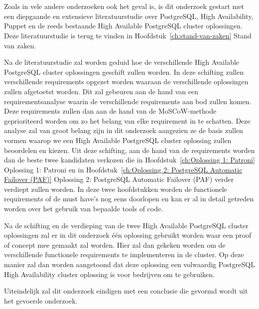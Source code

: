 
\chapter{}
\label{ch:methodologie}


Zoals in vele andere onderzoeken ook het geval is, is dit onderzoek gestart met een diepgaande en extensieve literatuurstudie over PostgreSQL, High Availability, Puppet en de reeds bestaande High Available PostgreSQL cluster oplossingen. Deze literatuurstudie is terug te vinden in Hoofdstuk~\ref{ch:stand-van-zaken} Stand van zaken.

Na de literatuurstudie zal worden geduid hoe de verschillende High Available PostgreSQL cluster oplossingen geschift zullen worden. In deze schifting zullen verschillende requirements opgezet worden waaraan de verschillende oplossingen zullen afgetoetst worden. Dit zal gebeuren aan de hand van een requirementsanalyse waarin de verschillende requirements aan bod zullen komen. Deze requirements zullen dan aan de hand van de MoSCoW-methode geprioriteerd worden om zo het belang van elke requirement in te schatten. Deze analyse zal van groot belang zijn in dit onderzoek aangezien ze de basis zullen vormen waarop we een High Available PostgreSQL cluster oplossing zullen beoordelen en kiezen.
Uit deze schifting, aan de hand van de requirements worden dan de beste twee kandidaten verkozen die in Hoofdstuk~\ref{ch:Oplossing 1: Patroni} Oplossing 1: Patroni en in Hoofdstuk~\ref{ch:Oplossing 2: PostgreSQL Automatic Failover (PAF)} Oplossing 2: PostgreSQL Automatic Failover (PAF) verder verdiept zullen worden. In deze twee hoofdstukken worden de functionele requirements of de must have's nog eens doorlopen en kan er al in detail getreden worden over het gebruik van bepaalde tools of code.


Na de schifting en de verdieping van de twee High Available PostgreSQL cluster oplossingen zal er in dit onderzoek één oplossing gebruikt worden waar een proof of concept mee gemaakt zal worden. Hier zal dan gekeken worden om de verschillende functionele requirements te implementeren in de cluster. Op deze manier zal dan worden aangetoond dat deze oplossing een volwaardig PostgreSQL High Availability cluster oplossing is voor bedrijven om te gebruiken.%

Uiteindelijk zal dit onderzoek eindigen met een conclusie die gevormd wordt uit het gevoerde onderzoek.

